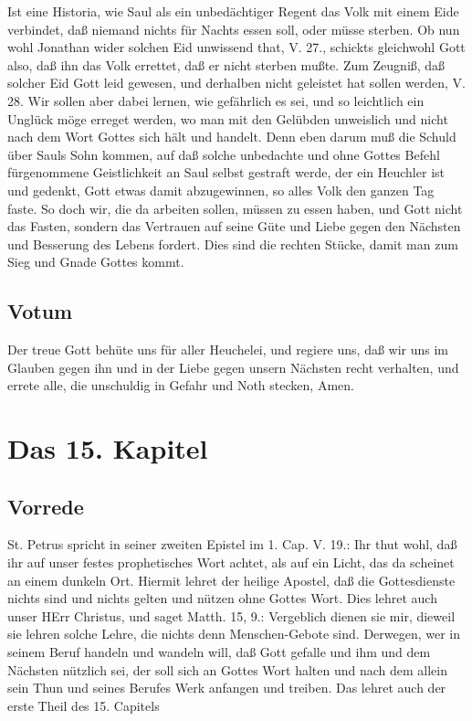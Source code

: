 Ist eine Historia, wie Saul als ein unbedächtiger Regent das Volk mit einem Eide verbindet, daß niemand nichts für Nachts essen soll, oder müsse sterben. Ob nun wohl Jonathan wider solchen Eid unwissend that, V. 27., schickts gleichwohl Gott also, daß ihn das Volk errettet, daß er nicht sterben mußte. Zum Zeugniß, daß solcher Eid Gott leid gewesen, und derhalben nicht geleistet hat sollen werden, V. 28. Wir sollen aber dabei lernen, wie gefährlich es sei, und so leichtlich ein Unglück möge erreget werden, wo man mit den Gelübden unweislich und nicht nach dem Wort Gottes sich hält und handelt. Denn eben darum muß die Schuld über Sauls Sohn kommen, auf daß solche unbedachte und ohne Gottes Befehl fürgenommene Geistlichkeit an Saul selbst gestraft werde, der ein Heuchler ist und gedenkt, Gott etwas damit abzugewinnen, so alles Volk den ganzen Tag faste. So doch wir, die da arbeiten sollen, müssen zu essen haben, und Gott nicht das Fasten, sondern das Vertrauen auf seine Güte und Liebe gegen den Nächsten und Besserung des Lebens fordert. Dies sind die rechten Stücke, damit man zum Sieg und Gnade Gottes kommt.

\section{Votum}

Der treue Gott behüte uns für aller Heuchelei, und regiere uns, daß wir uns im Glauben gegen ihn und in der Liebe gegen unsern Nächsten recht verhalten, und errete alle, die unschuldig in Gefahr und Noth stecken, Amen.

\chapter{Das 15. Kapitel}

\section{Vorrede}

St. Petrus spricht in seiner zweiten Epistel im 1. Cap. V. 19.: Ihr thut wohl, daß ihr auf unser festes prophetisches Wort achtet, als auf ein Licht, das da scheinet an einem dunkeln Ort. Hiermit lehret der heilige Apostel, daß die Gottesdienste nichts sind und nichts gelten und nützen ohne Gottes Wort. Dies lehret auch unser HErr Christus, und saget Matth. 15, 9.: Vergeblich dienen sie mir, dieweil sie lehren solche Lehre, die nichts denn Menschen-Gebote sind. Derwegen, wer in seinem Beruf handeln und wandeln will, daß Gott gefalle und ihm und dem Nächsten nützlich sei, der soll sich an Gottes Wort halten und nach dem allein sein Thun und seines Berufes Werk anfangen und treiben. Das lehret auch der erste Theil des 15. Capitels

